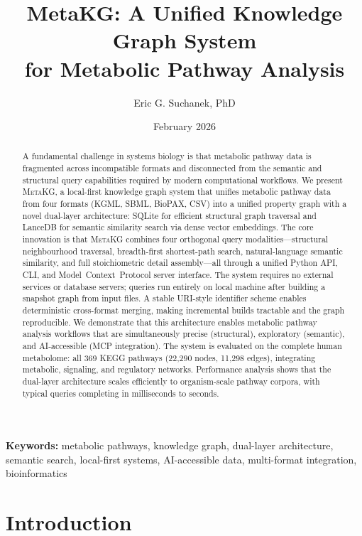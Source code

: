 \documentclass[10pt]{article}
\title{\textbf{MetaKG: A Unified Knowledge Graph System\\for Metabolic Pathway Analysis}}
\author[1]{Eric G. Suchanek, PhD}
\affil[1]{Flux Frontiers, \href{https://github.com/Flux-Frontiers}{github.com/Flux-Frontiers}}
\date{February 2026}
\begin{document}

\maketitle

\begin{abstract}
\noindent
A fundamental challenge in systems biology is that metabolic pathway data is
fragmented across incompatible formats and disconnected from the semantic and
structural query capabilities required by modern computational workflows. We
present \textsc{MetaKG}, a local-first knowledge graph system that unifies
metabolic pathway data from four formats (KGML, SBML, BioPAX, CSV) into a
unified property graph with a novel dual-layer architecture: SQLite for
efficient structural graph traversal and LanceDB for semantic similarity search
via dense vector embeddings. The core innovation is that \textsc{MetaKG}
combines four orthogonal query modalities---structural neighbourhood traversal,
breadth-first shortest-path search, natural-language semantic similarity, and
full stoichiometric detail assembly---all through a unified Python API, CLI,
and Model~Context~Protocol server interface. The system requires no external
services or database servers; queries run entirely on local machine after
building a snapshot graph from input files. A stable URI-style identifier
scheme enables deterministic cross-format merging, making incremental builds
tractable and the graph reproducible. We demonstrate that this architecture
enables metabolic pathway analysis workflows that are simultaneously precise
(structural), exploratory (semantic), and AI-accessible (MCP integration). The
system is evaluated on the complete human metabolome: all 369 KEGG pathways
(22,290 nodes, 11,298 edges), integrating metabolic, signaling, and regulatory
networks. Performance analysis shows that the dual-layer architecture scales
efficiently to organism-scale pathway corpora, with typical queries completing
in milliseconds to seconds.
\end{abstract}

\textbf{Keywords:} metabolic pathways, knowledge graph, dual-layer architecture,
semantic search, local-first systems, AI-accessible data, multi-format integration,
bioinformatics

\section{Introduction}
\end{document}
